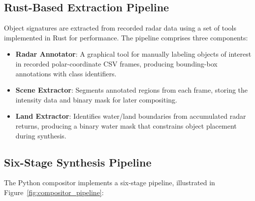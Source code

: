 \documentclass[conf]{new-aiaa}
\begin{document}
\subsection{Rust-Based Extraction Pipeline}
Object signatures are extracted from recorded radar data using a set of tools implemented in Rust for performance. The pipeline comprises three components:
\begin{itemize}
    \item \textbf{Radar Annotator}: A graphical tool for manually labeling objects of interest in recorded polar-coordinate CSV frames, producing bounding-box annotations with class identifiers.
    \item \textbf{Scene Extractor}: Segments annotated regions from each frame, storing the intensity data and binary mask for later compositing.
    \item \textbf{Land Extractor}: Identifies water/land boundaries from accumulated radar returns, producing a binary water mask that constrains object placement during synthesis.
\end{itemize}

\subsection{Six-Stage Synthesis Pipeline}
The Python compositor implements a six-stage pipeline, illustrated in Figure~\ref{fig:compositor_pipeline}:
\end{document}
